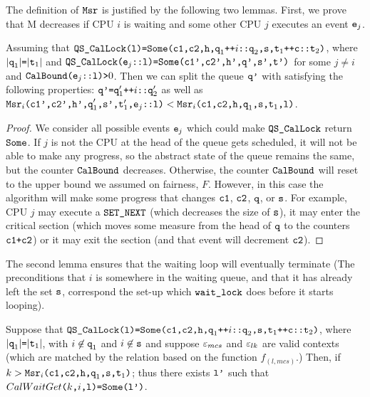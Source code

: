 The definition of ${\mathrm{\texttt{Msr}}}$ is justified by the following two
lemmas. First, we prove that M decreases if CPU $i$ is waiting and some other CPU
$j$ executes an event ${\mathrm{\texttt{e}}}_{j}$.

\begin{lemma}
\label{lem:chapter:mcslock:MCS_CalLock_progress_onestep}
Assuming that ${\mathrm{\texttt{QS\_CalLock}}}{\mathrm{\texttt{(l)=}}}{\mathrm{\texttt{Some}}}{\mathrm{\texttt{(c1,c2,h,q}}}_1{\mathrm{\texttt{++}}}i{\mathrm{\texttt{::q}}}_2{\mathrm{\texttt{,s,t}}}_1{\mathrm{\texttt{++c::t}}}_2{\mathrm{\texttt{)}}}$, where
$|{\mathrm{\texttt{q}}}_1|{\mathrm{\texttt{=}}}|{\mathrm{\texttt{t}}}_1|$ and ${\mathrm{\texttt{QS\_CalLock}}}{\mathrm{\texttt{(e}}}_j{\mathrm{\texttt{::l)=}}}{\mathrm{\texttt{Some}}}{\mathrm{\texttt{(c1',c2',h',q',s',t')}}} $
for some $j\neq i$ and 
 ${\mathrm{\texttt{CalBound}}}{\mathrm{\texttt{(e}}}_j{\mathrm{\texttt{::l)}}}{\mathrm{\texttt{>}}}0$.
Then we can split the queue ${\mathrm{\texttt{q'}}}$ with satisfying the following properties:
${\mathrm{\texttt{q'=q}}}_{1}'{\mathrm{\texttt{++}}}i{\mathrm{\texttt{::q}}}_{2}'$ as well as
${\mathrm{\texttt{Msr}}}_i{\mathrm{\texttt{(c1',c2',h',q}}}_{1}'{\mathrm{\texttt{,s',t}}}_{1}'{\mathrm{\texttt{,e}}}_j{\mathrm{\texttt{::l)}}}<{\mathrm{\texttt{Msr}}}_i{\mathrm{\texttt{(c1,c2,h,q}}}_1{\mathrm{\texttt{,s,t}}}_1{\mathrm{\texttt{,l)}}}$.
\end{lemma}

\begin{proof}
 We consider all possible events
${\mathrm{\texttt{e}}}_j$ which could make ${\mathrm{\texttt{QS\_CalLock}}}$ return ${\mathrm{\texttt{Some}}}$. If $j$ is not the 
CPU at the head of the queue gets scheduled, it will not be
able to make any progress, so the abstract state of the queue remains the same,
but the counter ${\mathrm{\texttt{CalBound}}}$ decreases.
Otherwise, the counter ${\mathrm{\texttt{CalBound}}}$ will reset to the upper bound we assumed on fairness, $F$. 
However, in this case the algorithm will make some progress that changes ${\mathrm{\texttt{c1}}}$, ${\mathrm{\texttt{c2}}}$, ${\mathrm{\texttt{q}}}$, or ${\mathrm{\texttt{s}}}$.
For example, CPU $j$ may execute a ${\mathrm{\texttt{SET\_NEXT}}}$ (which decreases the size of
${\mathrm{\texttt{s}}}$), it may enter the critical section (which moves some measure from
the head of ${\mathrm{\texttt{q}}}$ to the counters ${\mathrm{\texttt{c1+c2}}}$) or it may exit the section
(and that event will decrement ${\mathrm{\texttt{c2}}}$).
\end{proof}


The second lemma ensures that the waiting loop will eventually
terminate (The preconditions that $i$ is somewhere in the waiting queue,
and that it has already left the set ${\mathrm{\texttt{s}}}$, correspond the set-up
which ${\mathrm{\texttt{wait\_lock}}}$ does before it starts looping).

\begin{lemma}
\label{lem:chapter:mcslock:CalWaitGet_exist'}
Suppose that ${\mathrm{\texttt{QS\_CalLock}}}{\mathrm{\texttt{(l)=}}}{\mathrm{\texttt{Some}}}{\mathrm{\texttt{(c1,c2,h,q}}}_1{\mathrm{\texttt{++}}}i{\mathrm{\texttt{::q}}}_2{\mathrm{\texttt{,s,t}}}_1{\mathrm{\texttt{++c::t}}}_2{\mathrm{\texttt{)}}}$, where
$|{\mathrm{\texttt{q}}}_1|{\mathrm{\texttt{=}}}|{\mathrm{\texttt{t}}}_1|$, with $i \not\in{\mathrm{\texttt{q}}}_1$ and $i \not\in{\mathrm{\texttt{s}}}$ and suppose ${\varepsilon}_{mcs}$ and ${\varepsilon}_{lk}$  are valid
contexts (which are matched by the relation based on the function $f_{(l, mcs)}$.) Then, if $k>{\mathrm{\texttt{Msr}}}_i{\mathrm{\texttt{(c1,c2,h,q}}}_1{\mathrm{\texttt{,s,t}}}_1{\mathrm{\texttt{)}}}$; thus there exists ${\mathrm{\texttt{l'}}}$ such
that $CalWaitGet{\mathrm{\texttt{(}}}k{\mathrm{\texttt{,}}}i{\mathrm{\texttt{,l)=}}}{\mathrm{\texttt{Some}}}{\mathrm{\texttt{(l')}}}$.
\end{lemma}


